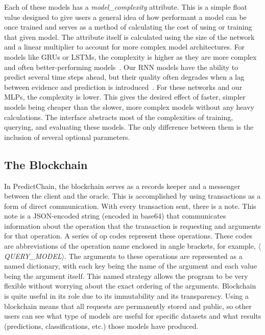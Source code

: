 \documentclass{ledger}
\begin{document}
Each of these models has a \textit{model\_complexity} attribute.  This is a simple float value designed to give users a general idea of how performant a model can be once trained and serves as a method of calculating the cost of using or training that given model.  The attribute itself is calculated using the size of the network and a linear multiplier to account for more complex model architectures.  For models like GRUs or LSTMs, the complexity is higher as they are more complex and often better-performing models~\cite{recurrentModeling}.  Our RNN models have the ability to predict several time steps ahead, but their quality often degrades when a lag between evidence and prediction is introduced~\cite{weightGuessing}.  For these networks and our MLPs, the complexity is lower. This gives the desired effect of faster, simpler models being cheaper than the slower, more complex models without any heavy calculations. The interface abstracts most of the complexities of training, querying, and evaluating these models. The only difference between them is the inclusion of several optional parameters.

\subsection{The Blockchain}

In PredictChain, the blockchain serves as a records keeper and a messenger between the client and the oracle. This is accomplished by using transactions as a form of direct communication.  With every transaction sent, there is a note. This note is a JSON-encoded string (encoded in base64) that communicates information about the operation that the transaction is requesting and arguments for that operation.  A series of op codes represent these operations.  These codes are abbreviations of the operation name enclosed in angle brackets, for example, $\langle$\textit{QUERY\_MODEL}$\rangle$. The arguments to these operations are represented as a named dictionary, with each key being the name of the argument and each value being the argument itself.  This named strategy allows the program to be very flexible without worrying about the exact ordering of the arguments.  Blockchain is quite useful in its role due to its immutability and its transparency.  Using a blockchain means that all requests are permanently stored and public, so other users can see what type of models are useful for specific datasets and what results (predictions, classifications, etc.) those models have produced.
\end{document}

